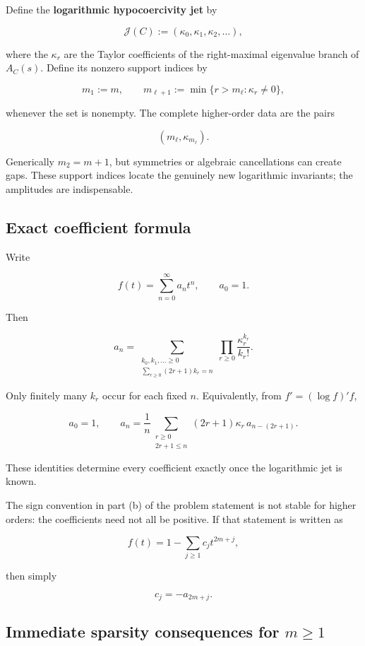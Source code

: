 \documentclass[11pt,a4paper]{article}
\begin{document}
Define the \textbf{logarithmic hypocoercivity jet} by

\[
\mathcal J(C):=(\kappa_0,\kappa_1,\kappa_2,\ldots),
\]

where the \(\kappa_r\) are the Taylor coefficients of the right-maximal eigenvalue branch of \(A_C(s)\). Define its nonzero support indices by

\[
m_1:=m,
\qquad
m_{\ell+1}:=\min\{r>m_\ell:\kappa_r\ne0\},
\]

whenever the set is nonempty. The complete higher-order data are the pairs

\[
\boxed{(m_\ell,\kappa_{m_\ell}).}
\]

Generically \(m_2=m+1\), but symmetries or algebraic cancellations can create gaps. These support indices locate the genuinely new logarithmic invariants; the amplitudes are indispensable.

\subsection{Exact coefficient formula}\label{exact-coefficient-formula}

Write

\[
f(t)=\sum_{n=0}^{\infty}a_nt^n,\qquad a_0=1.
\]

Then

\[
\boxed{
 a_n=
 \sum_{\substack{k_0,k_1,\ldots\ge0\\
                  \sum_{r\ge0}(2r+1)k_r=n}}
 \prod_{r\ge0}\frac{\kappa_r^{k_r}}{k_r!}.
}
\]

Only finitely many \(k_r\) occur for each fixed \(n\). Equivalently, from \(f'=(\log f)'f\),

\[
\boxed{
 a_0=1,\qquad
 a_n=\frac1n
 \sum_{\substack{r\ge0\\2r+1\le n}}
 (2r+1)\kappa_r\,a_{n-(2r+1)}.
}
\]

These identities determine every coefficient exactly once the logarithmic jet is known.

The sign convention in part (b) of the problem statement is not stable for higher orders: the coefficients need not all be positive. If that statement is written as

\[
f(t)=1-\sum_{j\ge1}c_jt^{2m+j},
\]

then simply

\[
c_j=-a_{2m+j}.
\]

\subsection{\texorpdfstring{Immediate sparsity consequences for \(m\ge 1\)}{Immediate sparsity consequences for m\textbackslash ge 1}}\label{immediate-sparsity-consequences-for-mge-1}
\end{document}
